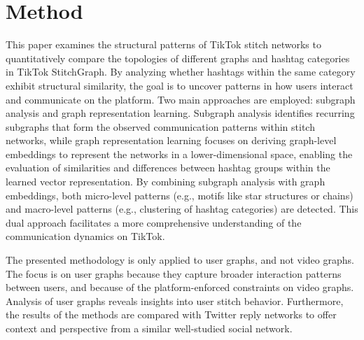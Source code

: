 \chapter{Method}

This paper examines the structural patterns of TikTok stitch networks to quantitatively compare the topologies of different graphs and hashtag categories in TikTok StitchGraph. By analyzing whether hashtags within the same category exhibit structural similarity, the goal is to uncover patterns in how users interact and communicate on the platform. Two main approaches are employed: subgraph analysis and graph representation learning. Subgraph analysis identifies recurring subgraphs that form the observed communication patterns within stitch networks, while graph representation learning focuses on deriving graph-level embeddings to represent the networks in a lower-dimensional space, enabling the evaluation of similarities and differences between hashtag groups within the learned vector representation. By combining subgraph analysis with graph embeddings, both micro-level patterns (e.g., motifs like star structures or chains) and macro-level patterns (e.g., clustering of hashtag categories) are detected. This dual approach facilitates a more comprehensive understanding of the communication dynamics on TikTok.


The presented methodology is only applied to user graphs, and not video graphs. The focus is on user graphs because they capture broader interaction patterns between users, and because of the platform-enforced constraints on video graphs. Analysis of user graphs reveals insights into user stitch behavior. Furthermore, the results of the methods are compared with Twitter reply networks to offer context and perspective from a similar well-studied social network.

